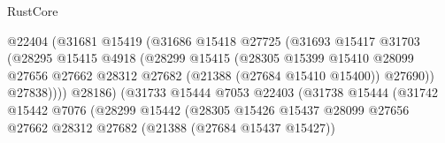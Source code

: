 \begin{lexlean}{RustCore}
\begin{coremodule}
                                          @22404
                                          (@31681
                                            @15419
                                            (@31686
                                              @15418
                                              @27725
                                              (@31693
                                                @15417
                                                @31703
                                                (@28295
                                                  @15415
                                                  @4918
                                                  (@28299
                                                    @15415
                                                    (@28305
                                                      @15399
                                                      @15410
                                                      @28099
                                                      @27656
                                                      @27662
                                                      @28312
                                                      @27682
                                                      (@21388 (@27684 @15410 @15400))
                                                      @27690))
                                                  @27838))))
                                          @28186)
                                        (@31733
                                          @15444
                                          @7053
                                          @22403
                                          (@31738
                                            @15444
                                            (@31742
                                              @15442
                                              @7076
                                              (@28299
                                                @15442
                                                (@28305
                                                  @15426
                                                  @15437
                                                  @28099
                                                  @27656
                                                  @27662
                                                  @28312
                                                  @27682
                                                  (@21388 (@27684 @15437 @15427))

\end{coremodule}
\end{lexlean}
